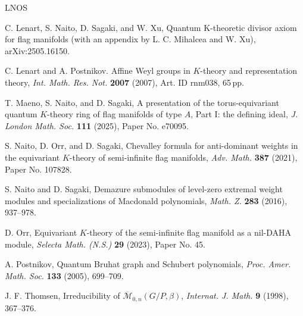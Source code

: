 \documentclass[11pt,a4paper,reqno,dvipdfmx]{amsart}
\numberwithin{equation}{section}
\newcommand{\CM}{\mathcal{M}}
\newcommand{\ol}[1]{\overline{#1}}
\theoremstyle{plain}
\theoremstyle{definition}
\theoremstyle{remark}
\begin{document}
\begin{thebibliography}{LNOS}

C. Lenart, S. Naito, D. Sagaki, and W. Xu, 
Quantum K-theoretic divisor axiom for flag manifolds 
(with an appendix by L. C. Mihalcea and W. Xu), 
arXiv:2505.16150. 

C. Lenart and A. Postnikov.
Affine Weyl groups in $K$-theory and representation theory, 
\textit{Int. Math. Res. Not.} \textbf{2007} (2007), 
Art. ID rnm038, 65\,pp.

%

%
%
T. Maeno, S. Naito, and D. Sagaki, 
A presentation of the torus-equivariant quantum $K$-theory ring
of flag manifolds of type $A$, Part I: the defining ideal, 
\textit{J. London Math. Soc.} \textbf{111} (2025), Paper No. e70095. 

S. Naito, D. Orr, and D. Sagaki, 
Chevalley formula for anti-dominant weights 
in the equivariant $K$-theory of semi-infinite flag manifolds, 
\textit{Adv. Math.} \textbf{387} (2021), Paper No. 107828.

S. Naito and D. Sagaki, 
Demazure submodules of level-zero extremal weight modules and 
specializations of Macdonald polynomials, 
\textit{Math. Z.} \textbf{283} (2016), 937--978.

D. Orr,
Equivariant $K$-theory of the semi-infinite flag manifold as a nil-DAHA module,
\textit{Selecta Math. (N.S.)} \textbf{29} (2023), Paper No. 45. 


A. Postnikov, Quantum Bruhat graph and Schubert polynomials, 
\textit{Proc. Amer. Math. Soc.} \textbf{133} (2005), 699--709.

J. F. Thomsen, Irreducibility of $\ol{\CM}_{0,n}(G/P, \beta)$, 
\textit{Internat. J. Math.} \textbf{9} (1998), 367--376.

%

\end{thebibliography}
\end{document}
